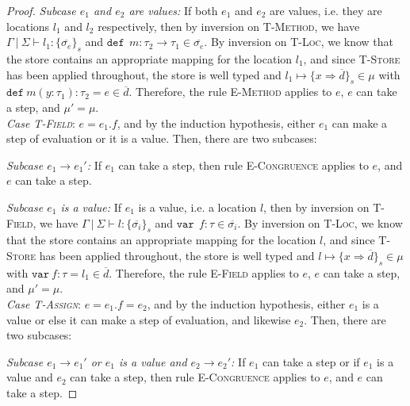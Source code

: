 \documentclass{llncs}
\newcommand{\keywadj}[1]{\mathtt{#1}}
\newcommand{\keyw}[1]{\keywadj{#1}~}
\begin{document}
\begin{proof}
\textit{Subcase $e_1$ and $e_2$ are values:} If both $e_1$ and $e_2$ are values, i.e. they are locations $l_1$ and $l_2$ respectively, then by inversion on \textsc{T-Method}, we have $\Gamma~|~\Sigma \vdash l_1 : \{ \overline{\sigma_e} \}_s$ and $\keyw{def}~ m : \tau_2 \rightarrow \tau_1 \in \overline{\sigma_e}$. By inversion on \textsc{T-Loc}, we know that the store contains an appropriate mapping for the location $l_1$, and since \textsc{T-Store} has been applied throughout, the store is well typed and $l_1 \mapsto \{ x \Rightarrow \overline{d} \}_{s} \in \mu$ with $\keyw{def} m(y : \tau_1) : \tau_2 = e \in \overline{d}$. Therefore, the rule \textsc{E-Method} applies to $e$, $e$ can take a step, and $\mu' = \mu$.
\\

\noindent\textit{Case \textsc{T-Field}}:
$e = e_1.f$, and by the induction hypothesis, either $e_1$ can make a step of evaluation or it is a value. Then, there are two subcases:

\textit{Subcase $e_1 \longrightarrow e_1'$:} If $e_1$ can take a step, then rule \textsc{E-Congruence} applies to $e$, and $e$ can take a step.

\textit{Subcase $e_1$ is a value:} If $e_1$ is a value, i.e. a location $l$, then by inversion on \textsc{T-Field}, we have $\Gamma~|~\Sigma \vdash l : \{ \overline{\sigma_i} \}_s$ and $\keyw{var}~ f : \tau \in \overline{\sigma_i}$. By inversion on \textsc{T-Loc}, we know that the store contains an appropriate mapping for the location $l$, and since \textsc{T-Store} has been applied throughout, the store is well typed and $l \mapsto \{ x \Rightarrow \overline{d} \}_{s} \in \mu$ with $\keyw{var} f : \tau = l_1 \in \overline{d}$. Therefore, the rule \textsc{E-Field} applies to $e$, $e$ can take a step, and $\mu' = \mu$.
\\

\noindent\textit{Case \textsc{T-Assign}}:
$e = e_1.f=e_2$, and by the induction hypothesis, either $e_1$ is a value or else it can make a step of evaluation, and likewise $e_2$. Then, there are two subcases:

\textit{Subcase $e_1 \longrightarrow e_1'$ or $e_1$ is a value and $e_2 \longrightarrow e_2'$:} If $e_1$ can take a step or if $e_1$ is a value and $e_2$ can take a step, then rule \textsc{E-Congruence} applies to $e$, and $e$ can take a step.


\end{proof}
\end{document}
